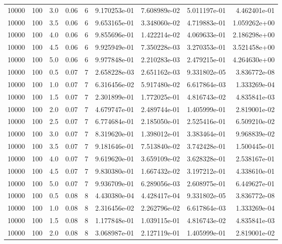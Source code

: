 \begin{tabular}{rrrrrrrrr}
 10000 &  100 &  3.0 &  0.06 &     6 &  9.170253e-01 &  7.608989e-02 &  5.011197e-01 &  4.462401e-01 \\
 10000 &  100 &  3.5 &  0.06 &     6 &  9.653165e-01 &  3.348060e-02 &  4.719883e-01 &  1.059262e+00 \\
 10000 &  100 &  4.0 &  0.06 &     6 &  9.855696e-01 &  1.422214e-02 &  4.069633e-01 &  2.186298e+00 \\
 10000 &  100 &  4.5 &  0.06 &     6 &  9.925949e-01 &  7.350228e-03 &  3.270353e-01 &  3.521458e+00 \\
 10000 &  100 &  5.0 &  0.06 &     6 &  9.977848e-01 &  2.210283e-03 &  2.479215e-01 &  4.264630e+00 \\
 10000 &  100 &  0.5 &  0.07 &     7 &  2.658228e-03 &  2.651162e-03 &  9.331802e-05 &  3.836772e-08 \\
 10000 &  100 &  1.0 &  0.07 &     7 &  6.316456e-02 &  5.917480e-02 &  6.617864e-03 &  1.333269e-04 \\
 10000 &  100 &  1.5 &  0.07 &     7 &  2.301899e-01 &  1.772025e-01 &  4.816743e-02 &  4.835841e-03 \\
 10000 &  100 &  2.0 &  0.07 &     7 &  4.679747e-01 &  2.489744e-01 &  1.405999e-01 &  2.819001e-02 \\
 10000 &  100 &  2.5 &  0.07 &     7 &  6.774684e-01 &  2.185050e-01 &  2.525416e-01 &  6.509210e-02 \\
 10000 &  100 &  3.0 &  0.07 &     7 &  8.319620e-01 &  1.398012e-01 &  3.383464e-01 &  9.968839e-02 \\
 10000 &  100 &  3.5 &  0.07 &     7 &  9.181646e-01 &  7.513840e-02 &  3.742428e-01 &  1.500445e-01 \\
 10000 &  100 &  4.0 &  0.07 &     7 &  9.619620e-01 &  3.659109e-02 &  3.628328e-01 &  2.538167e-01 \\
 10000 &  100 &  4.5 &  0.07 &     7 &  9.830380e-01 &  1.667432e-02 &  3.197212e-01 &  4.338610e-01 \\
 10000 &  100 &  5.0 &  0.07 &     7 &  9.936709e-01 &  6.289056e-03 &  2.608975e-01 &  6.449627e-01 \\
 10000 &  100 &  0.5 &  0.08 &     8 &  4.430380e-04 &  4.428417e-04 &  9.331802e-05 &  3.836772e-08 \\
 10000 &  100 &  1.0 &  0.08 &     8 &  2.316456e-02 &  2.262796e-02 &  6.617864e-03 &  1.333269e-04 \\
 10000 &  100 &  1.5 &  0.08 &     8 &  1.177848e-01 &  1.039115e-01 &  4.816743e-02 &  4.835841e-03 \\
 10000 &  100 &  2.0 &  0.08 &     8 &  3.068987e-01 &  2.127119e-01 &  1.405999e-01 &  2.819001e-02 \\

\end{tabular}
